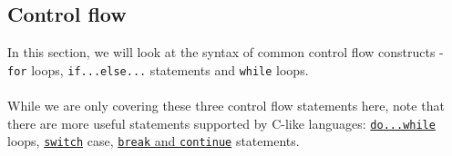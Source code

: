 \documentclass{article}
\begin{document}
\subsection{Control flow}
In this section, we will look at the syntax of common control flow constructs - \texttt{for} loops, \texttt{if...else...} statements and \texttt{while} loops.\\\\
While we are only covering these three control flow statements here, note that there are more useful statements supported by C-like languages: \href{https://www.programiz.com/c-programming/c-do-while-loops}{\texttt{do...while}} loops, \href{https://www.programiz.com/c-programming/c-switch-case-statement}{\texttt{switch}} case, \href{https://www.programiz.com/c-programming/c-break-continue-statement}{\texttt{break} and \texttt{continue}} statements.
\end{document}
